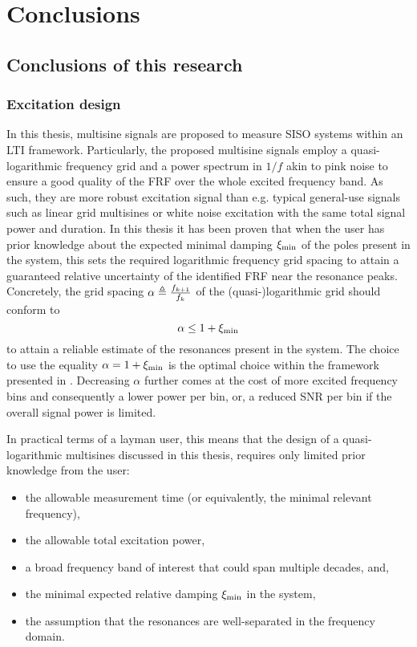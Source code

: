 \chapter{Conclusions}

\section{Conclusions of this research}

  \subsection{Excitation design}
  In this thesis, multisine signals are proposed to measure \gls{SISO} systems within an \gls{LTI} framework.
  Particularly, the proposed multisine signals employ a quasi-logarithmic frequency grid and a power spectrum in $1/f$ akin to pink noise to ensure a good quality of the \gls{FRF} over the whole excited frequency band.
  As such, they are more robust excitation signal than e.g. typical general-use signals such as linear grid multisines or white noise excitation with the same total signal power and duration.
  In this thesis it has been proven that when the user has prior knowledge about the expected minimal damping $\damping[\min]$ of the poles present in the system, this sets the required logarithmic frequency grid spacing to attain a guaranteed relative uncertainty of the identified \gls{FRF} near the resonance peaks.
  Concretely, the grid spacing $\alpha \isdef \frac{f_{k+1}}{f_k}$ of the (quasi-)logarithmic grid should conform to
  \begin{equation}
    \alpha \leq 1 + \damping[\min]
  \end{equation}
  to attain a reliable estimate of the resonances present in the system.
  The choice to use the equality $\alpha = 1+ \damping[\min]$ is the optimal choice within the framework presented in . 
  Decreasing $ \alpha$ further comes at the cost of more excited frequency bins and consequently a lower power per bin, or, a reduced \gls{SNR} per bin if the overall signal power is limited.

  In practical terms of a layman user, this means that the design of a quasi-logarithmic multisines discussed in this thesis, requires only limited prior knowledge from the user:
  \begin{itemize}
    \item the allowable measurement time (or equivalently, the minimal relevant frequency),
    \item the allowable total excitation power,
    \item a broad frequency band of interest that could span multiple decades, and,\
    \item the minimal expected relative damping $\damping[\min]$ in the system,
    \item the assumption that the resonances are well-separated in the frequency domain.
  \end{itemize}

